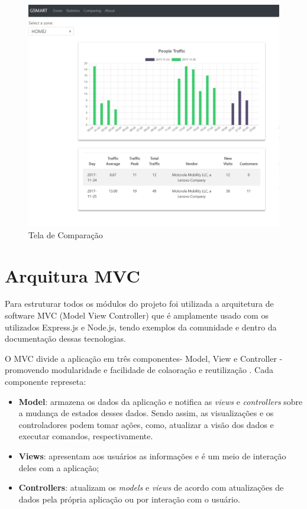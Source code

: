 \begin{figure}[!h]
  \caption{\label{comparing-ap}Tela de Comparação}
  \begin{center}
    \includegraphics[width=1.0\textwidth]{img/comparing.png}
  \end{center}
\end{figure}

\section{Arquitura MVC}
Para estruturar todos os módulos do projeto foi utilizada a arquitetura de
software MVC (Model View Controller) que é amplamente usado com os utilizados
Express.js e Node.js, tendo exemplos da comunidade e dentro da documentação dessas
tecnologias.

O MVC divide a aplicação em três componentes- Model, View e Controller -
promovendo modularidade e facilidade de colaoração e reutilização \cite{mdn}. Cada componente represeta:

\begin{itemize}
    \item \textbf{Model}: armazena os dados da aplicação e notifica as \emph{views} e
    \emph{controllers} sobre a mudança de estados desses dados. Sendo assim, as visualizações e os controladores
    podem tomar ações, como, atualizar a visão dos dados e executar comandos, respectivamente.
    \item \textbf{Views}: apresentam aos usuários as informações e é um meio de interação deles com
    a aplicação;
    \item \textbf{Controllers}: atualizam os \emph{models} e \emph{views} de acordo
    com atualizações de dados pela própria aplicação ou por interação com o usuário.
\end{itemize}

